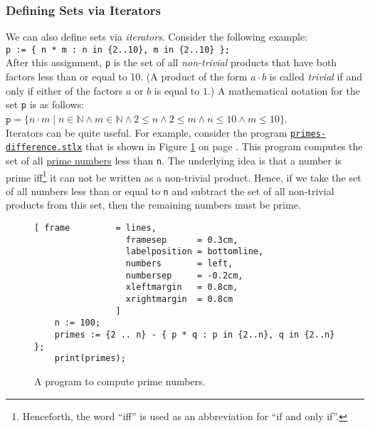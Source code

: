 \subsubsection{Defining Sets via Iterators}
We can also define sets via \emph{iterators}.  Consider the following example:
\\[0.2cm]
\hspace*{1.3cm} 
\texttt{p := \{ n * m : n in \{2..10\}, m in \{2..10\} \};} 
\\[0.2cm]
After this assignment,  \texttt{p} is the set of all \emph{non-trivial} products that have both factors
less than or equal to 10.  (A product of the form $a \cdot b$ is called \emph{trivial} if and only if
either of the factors  $a$ or $b$ is equal to $1$.)
A mathematical notation for the set  \texttt{p} is as follows:
\\[0.2cm]
\hspace*{1.3cm} 
$\mathtt{p} = \bigl\{ n \cdot m \mid n \in \mathbb{N} \wedge m \in \mathbb{N} \wedge 
                                 2 \leq n \wedge 2 \leq m \wedge n \leq 10 \wedge m \leq 10 
              \bigl\}
$. 
\\[0.2cm]
Iterators can be quite useful.  For example, consider the program 
\href{https://github.com/karlstroetmann/Logik/blob/master/SetlX/primes-difference.stlx}{\texttt{primes-difference.stlx}}
that is shown in Figure \ref{fig:primes-sieve.stlx} on page \pageref{fig:primes-sieve.stlx}.
This program computes the set of all \href{https://en.wikipedia.org/wiki/Prime_number}{prime
  numbers} less than \texttt{n}.  The underlying idea is that 
a number is prime iff\footnote{
  Henceforth, the word ``iff'' is used as an abbreviation for ``if and only if''.
}  
it can not be written as a non-trivial product.  Hence, if we take the set of all numbers less than
or equal to \texttt{n} and subtract the set of all non-trivial products from this set, then the
remaining numbers must be prime.


\begin{figure}[!ht]
  \centering
\begin{Verbatim}[ frame         = lines, 
                  framesep      = 0.3cm, 
                  labelposition = bottomline,
                  numbers       = left,
                  numbersep     = -0.2cm,
                  xleftmargin   = 0.8cm,
                  xrightmargin  = 0.8cm
                ]
    n := 100;
    primes := {2 .. n} - { p * q : p in {2..n}, q in {2..n} };
    print(primes);
\end{Verbatim} 
\vspace*{-0.3cm}
\caption{A program to compute prime numbers.}
  \label{fig:primes-sieve.stlx}
\end{figure} 


